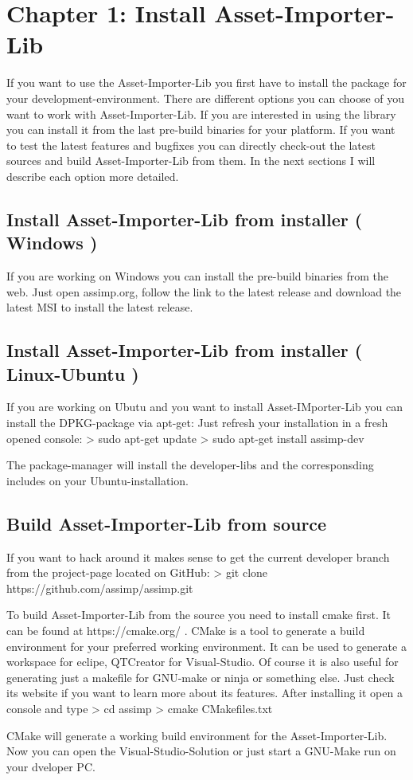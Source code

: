 
\section{Chapter 1: Install Asset-Importer-Lib}
If you want to use the Asset-Importer-Lib you first have to install the package for your development-environment. There are different options you can choose of you want to
work with Asset-Importer-Lib. If you are interested in using the library you can install it from the last pre-build binaries for your platform. If you want to test the
latest features and bugfixes you can directly check-out the latest sources and build Asset-Importer-Lib from them.
In the next sections I will describe each option more detailed.

\subsection{Install Asset-Importer-Lib from installer ( Windows ) }
If you are working on Windows you can install the pre-build binaries from the web. Just open assimp.org, follow the link to the latest release and download the 
latest MSI to install the latest release.

\subsection{Install Asset-Importer-Lib from installer ( Linux-Ubuntu ) }
If you are working on Ubutu and you want to install Asset-IMporter-Lib you can install the DPKG-package via apt-get:
Just refresh your installation in a fresh opened console:
> sudo apt-get update
> sudo apt-get install assimp-dev

The package-manager will install the developer-libs and the corresponsding includes on your Ubuntu-installation.
 
\subsection{Build Asset-Importer-Lib from source}
If you want to hack around it makes sense to get the current developer branch from the project-page located on GitHub:
> git clone https://github.com/assimp/assimp.git

To build Asset-Importer-Lib from the source you need to install cmake first. It can be found at https://cmake.org/ . CMake is a tool to generate a build environment 
for your preferred working environment. It can be used to generate a workspace for eclipe, QTCreator for Visual-Studio. Of course it is also useful for generating just 
a makefile for GNU-make or ninja or something else. Just check its website if you want to learn more about its features. After installing it open a console and type
> cd assimp
> cmake CMakefiles.txt

CMake will generate a working build environment for the Asset-Importer-Lib. Now you can open the Visual-Studio-Solution or just start a GNU-Make run on your dveloper PC.

